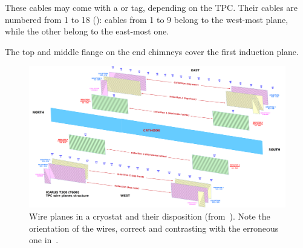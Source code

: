 These cables may come with a  or  tag, depending on the TPC.
Their cables are numbered from 1 to 18 (\eg {}):
cables from 1 to 9 belong to the west-most plane, while the other belong to the east-most one.

The top and middle flange on the end chimneys cover the first induction plane.



\begin{figure}[p]
  \centerline{\includegraphics[width=0.90\textheight,angle=90]{figures/Icarus_TPC_wp}}
  \caption{
    Wire planes in a cryostat and their disposition (from~\cite{SBNDocDBxxxx:ConnTest}).
    Note the orientation of the wires, correct and contrasting with the erroneous one in~\cite{SBNDocDB1020}.
    \label{fig:WirePlanesInTPC}
  }
\end{figure}





